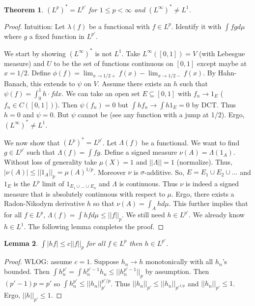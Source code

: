 \documentclass{article}
\newtheorem{theorem}{Theorem}[section]
\newtheorem{lemma}[theorem]{Lemma}
\theoremstyle{definition}
\begin{document}
\begin{theorem}
    $(L^p)^*=L^{p'}$ for $1\leq p<\infty$ and $(L^\infty)^*\neq L^1$.
\end{theorem}

\begin{proof}
    Intuition: Let $\lambda(f)$ be a functional with $f\in L^p$. Identify it with $\int fgd\mu$ where $g$ a fixed function in $L^{p'}$.

    We start by showing $(L^\infty)^*$ is not $L^1$. Take $L^\infty([0,1])=V$ (with Lebesgue measure) and $U$ to be the set of functions continuous on $[0,1]$
    except maybe at $x=1/2$. Define $\phi(f)=\lim_{x\to 1/2 +} f(x)-\lim_{x\to 1/2 -}f(x)$. By Hahn-Banach, this extends to $\psi$ on $V$.
    Assume there exists an $h$ such that $\psi(f)=\int_0^1 h\cdot f d x$. We can take an open set $E\subseteq [0,1]$ with $f_n\to 1_E$ ($f_n\in C([0,1])$).
    Then $\psi(f_n)=0$ but $\int h f_n\to \int h 1_E=0$ by DCT. Thus $h=0$ and $\psi=0$. But $\psi$ cannot be (see any function with a jump at 1/2).
    Ergo, $(L^\infty)^*\neq L^1$.

    We now show that $(L^p)^*=L^{p'}$. Let $\Lambda(f)$ be a functional. We want to find $g\in L^{p'}$ such that $\Lambda(f)=\int fg$.
    Define a signed measure $\nu(A)=\Lambda (1_A)$. Without loss of generality take $\mu(X)=1$ and $||\Lambda||=1$ (normalize).
    Thus, $|\nu(A)|\leq ||1_A||_p=\mu(A)^{1/p}$. Moreover $\nu$ is $\sigma$-additive. So, $E=E_1\cup E_2\cup\ldots$ and
    $1_E$ is the $L^p$ limit of $1_{E_1\cup \dots\cup E_n}$ and $\Lambda$ is continuous. Thus $\nu$ is indeed a signed measure
    that is absolutely continuous with respect to $\mu$. Ergo, there exists a Radon-Nikodym derivative $h$ so that
    $\nu(A)=\int_A h d\mu$. This further implies that for all $f\in L^p$, $\Lambda(f)=\int hf d\mu\leq ||f||_p$. We still need $h\in L^{p'}$.
    We already know $h\in L^1$. The following lemma completes the proof.
\end{proof}

\begin{lemma}
    $\int |hf|\leq c||f||_p$ for all $f\in L^p$ then $h\in L^{p'}$.
\end{lemma}

\begin{proof}
    WLOG: assume $c=1$. Suppose $h_n\to h$ monotonically with all $h_n$'s bounded. Then $\int h_n^{p'}=\int h_n^{p'-1}h_n\leq ||h_n^{p'-1}||_p$ by
    assumption. Then $(p'-1)p=p'$ so $\int h_n^{p'}\leq ||h_n||_{p'}^{p'/p}$. Thus $||h_n||_{p'}\leq ||h_n||_{p'^{1/p}}$ and
    $||h_n||_{p'}\leq 1$. Ergo, $||h||_{p'}\leq 1$.
\end{proof}
\end{document}
